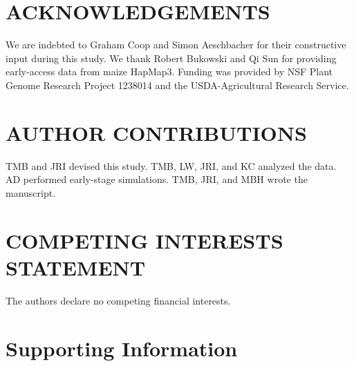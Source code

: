 \documentclass[12pt,a4paper]{article}
\begin{document}
\section*{ACKNOWLEDGEMENTS}
We are indebted to Graham Coop and Simon Aeschbacher for their constructive input during this study. We thank Robert Bukowski and Qi Sun for providing early-access data from maize HapMap3. Funding was provided by NSF Plant Genome Research Project 1238014 and the USDA-Agricultural Research Service.

\section*{AUTHOR CONTRIBUTIONS}
TMB and JRI devised this study. TMB, LW, JRI, and KC analyzed the data. AD performed early-stage simulations. TMB, JRI, and MBH wrote the manuscript.

\section*{COMPETING INTERESTS STATEMENT}
The authors declare no competing financial interests.


{\scriptsize \sf
\renewcommand{\baselinestretch}{2.0}


}





\onecolumn
\section*{Supporting Information}
\renewcommand\thefigure{S\arabic{figure}}
\renewcommand\thetable{S\arabic{table}}    
\setcounter{figure}{0}
\setcounter{table}{0}
\end{document}
